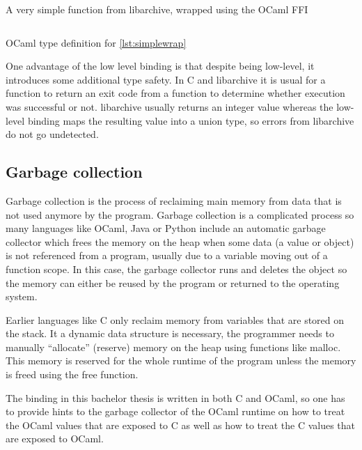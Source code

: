 \documentclass[parskip=half]{scrreprt}
\newcommand\inline[1]{{\addfontfeature{Letters=SmallCaps}#1}}
\begin{document}
\begin{listing}[h]
  \inputminted[linenos]{c}{simple-wrap.c}
  \caption{A very simple function from libarchive, wrapped using the OCaml FFI}
  \label{lst:simplewrap}
\end{listing}

\begin{listing}[h]
  \inputminted[linenos]{ocaml}{simple-wrap.ml}
  \caption{OCaml type definition for \autoref{lst:simplewrap}}
  \label{lst:simpletype}
\end{listing}

One advantage of the low level binding is that despite being low-level, it
introduces some additional type safety. In C and libarchive it is usual for a
function to return an exit code from a function to determine whether execution
was successful or not. libarchive usually returns an integer value whereas the
low-level binding maps the resulting value into a union type, so errors from
libarchive do not go undetected.

\subsection{Garbage collection}
\label{sec:gc}

Garbage collection is the process of reclaiming main memory from data that is
not used anymore by the program. Garbage collection is a complicated process so
many languages like OCaml, Java or Python include an automatic garbage
collector which frees the memory on the heap when some data (a value or object)
is not referenced from a program, usually due to a variable moving out of a
function scope. In this case, the garbage collector runs and deletes the object
so the memory can either be reused by the program or returned to the operating
system.

Earlier languages like C only reclaim memory from variables that are stored on
the stack. It a dynamic data structure is necessary, the programmer needs to
manually \enquote{allocate} (reserve) memory on the heap using functions like
\inline{malloc}. This memory is reserved for the whole runtime of the program
unless the memory is freed using the \inline{free} function.

The binding in this bachelor thesis is written in both C and OCaml, so one has
to provide hints to the garbage collector of the OCaml runtime on how to treat
the OCaml values that are exposed to C as well as how to treat the C values
that are exposed to OCaml.
\end{document}
